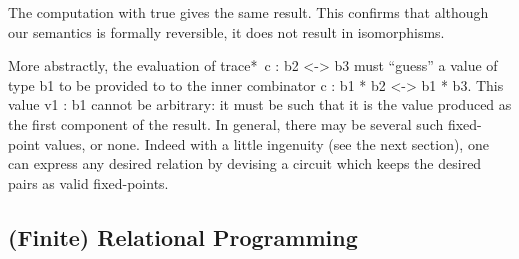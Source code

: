 \documentclass[preprint]{sigplanconf}
\begin{document}
\noindent The computation with {{true}} gives the same result. This confirms
that although our semantics is formally reversible, it does not result in
isomorphisms.

More abstractly, the evaluation of {{trace*~c : b2 <-> b3}} must ``guess'' a
value of type {{b1}} to be provided to to the inner combinator 
{{c : b1 * b2 <-> b1 * b3}}. 
This value {{v1 : b1}} cannot be arbitrary: it must be such that it is the value
produced as the first component of the result.  In general, there may be
several such fixed-point values, or none. Indeed with a little ingenuity 
(see the next section), one can 
express any desired relation by devising a circuit which keeps the desired pairs as 
valid fixed-points. 







\subsection{(Finite) Relational Programming}
\label{ch3:sec:lp}
\end{document}
